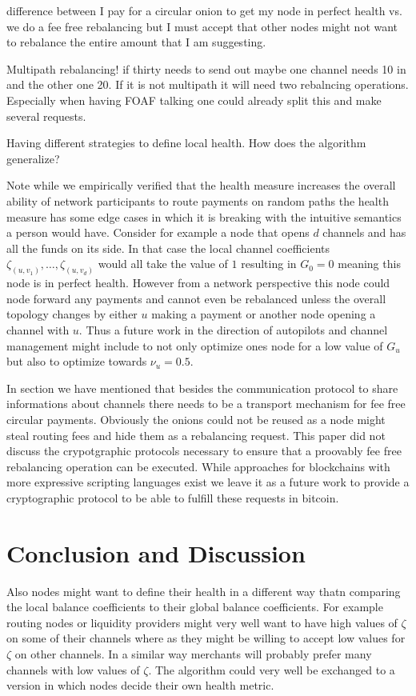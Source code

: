\documentclass[a4paper]{paper}
\begin{document}
difference between I pay for a circular onion to get my node in perfect health vs. we do a fee free rebalancing but I must accept that other nodes might not want to rebalance the entire amount that I am suggesting.

Multipath rebalancing! if thirty needs to send out maybe one channel needs 10 in and the other one 20. If it is not multipath it will need two rebalncing operations. Especially when having FOAF talking one could already split this and make several requests.

Having different strategies to define local health. How does the algorithm generalize? 

Note while we empirically verified that the health measure increases the overall ability of network participants to route payments on random paths the health measure has some edge cases in which it is breaking with the intuitive semantics a person would have.
Consider for example a node that opens $d$ channels and has all the funds on its side.
In that case the local channel coefficients $\zeta_{(u,v_1)},\dots,\zeta_{(u,v_d)}$ would all take the value of $1$ resulting in $G_0 = 0$ meaning this node is in perfect health.
However from a network perspective this node could node forward any payments and cannot even be rebalanced unless the overall topology changes by either $u$ making a payment or another node opening a channel with $u$.
Thus a future work in the direction of autopilots and channel management might include to not only optimize ones node for a low value of $G_u$ but also to optimize towards $\nu_u = 0.5$.

In section we have mentioned that besides the communication protocol to share informations about channels there needs to be a transport mechanism for fee free circular payments.
Obviously the onions could not be reused as a node might steal routing fees and hide them as a rebalancing request.
This paper did not discuss the crypotgraphic protocols necessary to ensure that a proovably fee free rebalancing operation can be executed.
While approaches for blockchains with more expressive scripting languages exist \cite{khalil2017revive} we leave it as a future work to provide a cryptographic protocol to be able to fulfill these requests in bitcoin.

\section{Conclusion and Discussion}

Also nodes might want to define their health in a different way thatn comparing the local balance coefficients to their global balance coefficients.
For example routing nodes or liquidity providers might very well want to have high values of $\zeta$ on some of their channels where as they might be willing to accept low values for $\zeta$ on other channels.
In a similar way merchants will probably prefer many channels with low values of $\zeta$.
The algorithm could very well be exchanged to a version in which nodes decide their own health metric.
\end{document}
